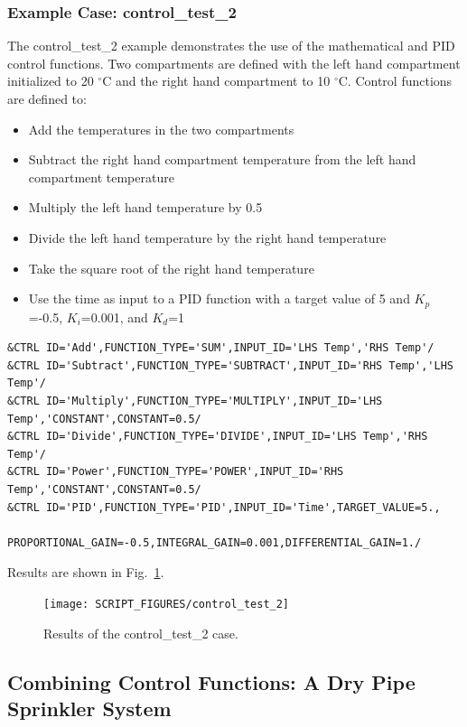\documentclass[11pt]{book}
\begin{document}
\subsubsection{Example Case: control\_test\_2 }
\label{control_test_2}

The {\ct control\_test\_2} example demonstrates the use of the mathematical and PID control functions.  Two compartments are defined with the left hand compartment initialized to 20 $^\circ$C and the right hand compartment to 10 $^\circ$C.    Control functions are defined to:

\begin{itemize}
\item Add the temperatures in the two compartments
\item Subtract the right hand compartment temperature from the left hand compartment temperature
\item Multiply the left hand temperature by 0.5
\item Divide the left hand temperature by the right hand temperature
\item Take the square root of the right hand temperature
\item Use the time as input to a PID function with a target value of 5 and $K_p$=-0.5, $K_i$=0.001, and $K_d$=1
\end{itemize}

\begin{lstlisting}
&CTRL ID='Add',FUNCTION_TYPE='SUM',INPUT_ID='LHS Temp','RHS Temp'/
&CTRL ID='Subtract',FUNCTION_TYPE='SUBTRACT',INPUT_ID='RHS Temp','LHS Temp'/
&CTRL ID='Multiply',FUNCTION_TYPE='MULTIPLY',INPUT_ID='LHS Temp','CONSTANT',CONSTANT=0.5/
&CTRL ID='Divide',FUNCTION_TYPE='DIVIDE',INPUT_ID='LHS Temp','RHS Temp'/
&CTRL ID='Power',FUNCTION_TYPE='POWER',INPUT_ID='RHS Temp','CONSTANT',CONSTANT=0.5/
&CTRL ID='PID',FUNCTION_TYPE='PID',INPUT_ID='Time',TARGET_VALUE=5.,
          PROPORTIONAL_GAIN=-0.5,INTEGRAL_GAIN=0.001,DIFFERENTIAL_GAIN=1./
\end{lstlisting}

\noindent Results are shown in Fig.~\ref{control_test_2_fig}.
\begin{figure}[ht]
\centering
\texttt{[image: SCRIPT\_FIGURES/control\_test\_2]}
\caption[Results of the {\ct control\_test\_2} case]{Results of the {\ct control\_test\_2} case.}
\label{control_test_2_fig}
\end{figure}


\subsection{Combining Control Functions: A Dry Pipe Sprinkler System}
\label{info:dry_pipe}
\end{document}
